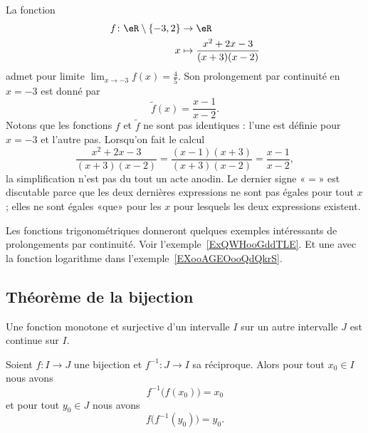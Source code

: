 \begin{example}
    La fonction
    \begin{equation}
        \begin{aligned}
            f\colon \eR\setminus\{ -3,2 \}&\to \eR \\
            x&\mapsto  \frac{ x^2+2x-3 }{ (x+3)(x-2) }
        \end{aligned}
    \end{equation}
    admet pour limite \( \lim_{x\to -3} f(x)=\frac{ 4 }{ 5 }\). Son prolongement par continuité en \( x=-3\) est donné par
    \begin{equation}
        \tilde f(x)=\frac{ x-1 }{ x-2 }.
    \end{equation}
    Notons que les fonctions \( f\) et \( \tilde f\) ne sont pas identiques : l'une est définie pour \( x=-3\) et l'autre pas. Lorsqu'on fait le calcul
    \begin{equation}
        \frac{ x^2+2x-3 }{ (x+3)(x-2) }=\frac{ (x-1)(x+3) }{ (x+3)(x-2) }=\frac{ x-1 }{ x-2 },
    \end{equation}
    la simplification n'est pas du tout un acte anodin. Le dernier signe «\( =\)» est discutable parce que les deux dernières expressions ne sont pas égales pour tout \( x\); elles ne sont égales «que» pour les \( x\) pour lesquels les deux expressions existent.
\end{example}

Les fonctions trigonométriques donneront quelques exemples intéressants de prolongements par continuité. Voir l'exemple~\ref{ExQWHooGddTLE}. Et une avec la fonction logarithme dans l'exemple~\ref{EXooAGEOooQdQkrS}.


\subsection{Théorème de la bijection}

\begin{proposition} \label{PropOARooUuCaYT}
    Une fonction monotone et surjective d'un intervalle $I$ sur un autre intervalle $J$ est continue sur $I$.
\end{proposition}

\begin{proposition}
    Soient \( f\colon I\to J\) une bijection et \( f^{-1}\colon J\to I\) sa réciproque. Alors pour tout \( x_0\in I\) nous avons
    \begin{equation}    \label{EqHQRooNmLYbF}
        f^{-1}\big( f(x_0) \big)=x_0
    \end{equation}
    et pour tout \( y_0\in J\) nous avons
    \begin{equation}    \label{EqIYTooQPvZDr}
        f\big( f^{-1}(y_0) \big)=y_0.
    \end{equation}
\end{proposition}

